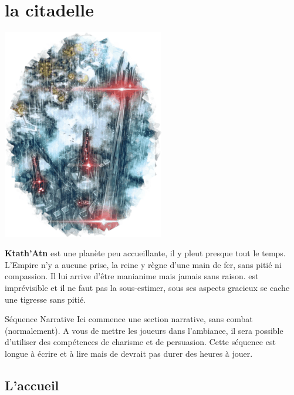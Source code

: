 \section{la citadelle}

\includegraphics[width=200pt]{_img/places/citadel-of-ktath-atn.png}

\textbf{Ktath’Atn} est une planète peu accueillante, il y pleut presque tout le temps. L’Empire n’y a aucune prise, la reine y règne d’une main de fer, sans pitié ni compassion. Il lui arrive d’être manianime mais jamais sans raison.  est imprévisible et il ne faut pas la sous-estimer, sous ses aspects gracieux se cache une tigresse sans pitié.

\begin{paperbox}{Séquence Narrative}
Ici commence une section narrative, sans combat (normalement). A vous de mettre les joueurs dans l’ambiance, il sera possible d’utiliser des compétences de charisme et de persuasion. Cette séquence est longue à écrire et à lire mais de devrait pas durer des heures à jouer.
\end{paperbox}

\subsection{L’accueil}

